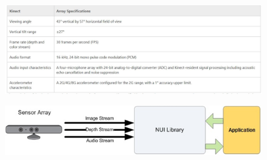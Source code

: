 \begin{figure}[h]
\centering
\begin{minipage}{7.0cm}
    \centering
    \label{fig:1}
\end{minipage}
\begin{minipage}{7.0cm}
    \centering
    \label{fig:2}
\end{minipage}
\end{figure}


\begin{figure}[h]
    \centering
    \includegraphics[height=0.25\textheight]{fig02/kinspecs.jpg}
    \label{fig:kinect}
\end{figure}
\begin{figure}[h]
    \centering
    \includegraphics[height=0.10\textheight]{fig02/pipeline}
    \label{fig:kinect}
\end{figure}


